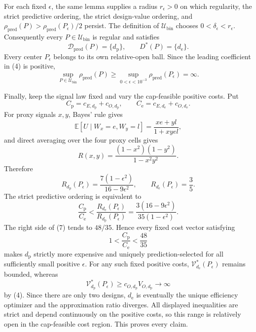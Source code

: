 For each fixed \(\epsilon\), the same lemma supplies a radius \(r_\epsilon>0\) on which regularity, the strict predictive ordering, the strict design-value ordering, and
\(\rho_{\mathrm{pred}}(P)>\rho_{\mathrm{pred}}(P_\epsilon)/2\) persist.  The definition of \(\mathcal U_{\mathrm{bin}}\) chooses \(0<\delta_\epsilon<r_\epsilon\).  Consequently every \(P\in\mathcal U_{\mathrm{bin}}\) is regular and satisfies
\[
 \mathcal D_{\mathrm{pred}}(P)=\{d_{\mathrm p}\},
 \qquad
 D^*(P)=\{d_{\mathrm e}\}. \tag{5}
\]
Every center \(P_\epsilon\) belongs to its own relative-open ball.  Since the leading coefficient in (4) is positive,
\[
 \sup_{P\in\mathcal U_{\mathrm{bin}}}\rho_{\mathrm{pred}}(P)
 \ge \sup_{0<\epsilon<10^{-3}}\rho_{\mathrm{pred}}(P_\epsilon)
 =\infty. \tag{6}
\]

Finally, keep the signal law fixed and vary the cap-feasible positive costs.  Put
\[
 C_{\mathrm p}=c_{E,d_{\mathrm p}}+c_{O,d_{\mathrm p}},
 \qquad
 C_{\mathrm e}=c_{E,d_{\mathrm e}}+c_{O,d_{\mathrm e}}.
\]
For proxy signals \(x,y\), Bayes' rule gives
\[
 \mathbb E[U\mid W_x=e,W_y=l]=\frac{xe+yl}{1+xyel},
\]
and direct averaging over the four proxy cells gives
\[
 R(x,y)=\frac{(1-x^2)(1-y^2)}{1-x^2y^2}.
\]
Therefore
\[
 R_{d_{\mathrm p}}(P_\epsilon)
 =\frac{7(1-\epsilon^2)}{16-9\epsilon^2},
 \qquad
 R_{d_{\mathrm e}}(P_\epsilon)=\frac35.
\]
The strict predictive ordering is equivalent to
\[
 \frac{C_{\mathrm p}}{C_{\mathrm e}}
 <\frac{R_{d_{\mathrm e}}(P_\epsilon)}{R_{d_{\mathrm p}}(P_\epsilon)}
 =\frac{3(16-9\epsilon^2)}{35(1-\epsilon^2)}. \tag{7}
\]
The right side of (7) tends to \(48/35\).  Hence every fixed cost vector satisfying
\[
 1<\frac{C_{\mathrm p}}{C_{\mathrm e}}<\frac{48}{35}
\]
makes \(d_{\mathrm p}\) strictly more expensive and uniquely prediction-selected for all sufficiently small positive \(\epsilon\).  For any such fixed positive costs, \(\mathcal V_{d_{\mathrm e}}^*(P_\epsilon)\) remains bounded, whereas
\[
 \mathcal V_{d_{\mathrm p}}^*(P_\epsilon)
 \ge c_{O,d_{\mathrm p}}V_{O,d_{\mathrm p}}\longrightarrow\infty
\]
by (4).  Since there are only two designs, \(d_{\mathrm e}\) is eventually the unique efficiency optimizer and the approximation ratio diverges.  All displayed inequalities are strict and depend continuously on the positive costs, so this range is relatively open in the cap-feasible cost region.  This proves every claim.